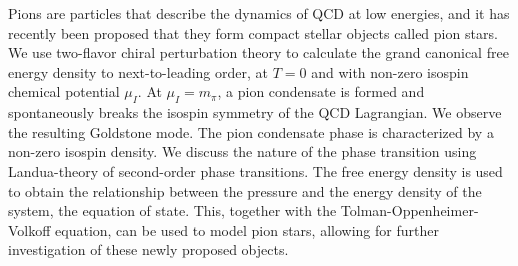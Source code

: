 Pions are particles that describe the dynamics of QCD at low energies, and it has recently been proposed that they form compact stellar objects called pion stars.
We use two-flavor chiral perturbation theory to calculate the grand canonical free energy density to next-to-leading order, at $T = 0$ and with non-zero isospin chemical potential $\mu_I$.
At $\mu_I = m_\pi$, a pion condensate is formed and spontaneously breaks the isospin symmetry of the QCD Lagrangian.
We observe the resulting Goldstone mode.
The pion condensate phase is characterized by a non-zero isospin density.
We discuss the nature of the phase transition using Landua-theory of second-order phase transitions.
The free energy density is used to obtain the relationship between the pressure and the energy density of the system, the equation of state.
This, together with the Tolman-Oppenheimer-Volkoff equation, can be used to model pion stars, allowing for further investigation of these newly proposed objects.
